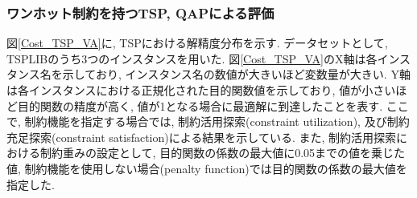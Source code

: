\documentclass[submit,techrep,noauthor]{ipsj}
\begin{document}



\subsubsection{ワンホット制約を持つTSP, QAPによる評価}
図\ref{Cost_TSP_VA}に, TSPにおける解精度分布を示す. データセットとして, TSPLIB\cite{tsplib}のうち3つのインスタンスを用いた. 図\ref{Cost_TSP_VA}のX軸は各インスタンス名を示しており, インスタンス名の数値が大きいほど変数量が大きい. Y軸は各インスタンスにおける正規化された目的関数値を示しており, 値が小さいほど目的関数の精度が高く, 値が1となる場合に最適解に到達したことを表す. ここで, 制約機能を指定する場合では, 制約活用探索(constraint utilization), 及び制約充足探索(constraint satisfaction)による結果を示している. また, 制約活用探索における制約重みの設定として, 目的関数の係数の最大値に0.05までの値を乗じた値, 制約機能を使用しない場合(penalty function)では目的関数の係数の最大値を指定した.
\end{document}
